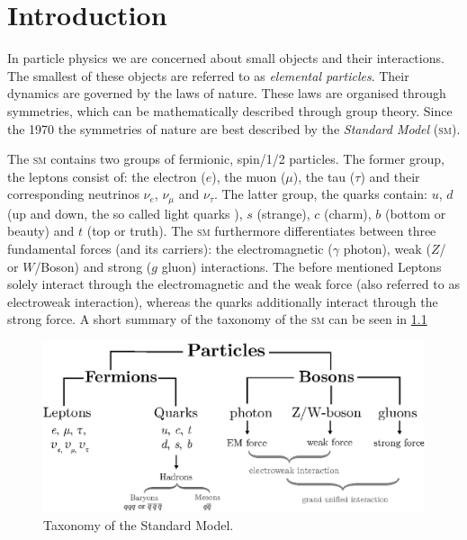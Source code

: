 \documentclass[../../index.tex]{subfiles}
\begin{document}
\chapter{Introduction}
In particle physics we are concerned about small objects and their interactions.
The smallest of these objects are referred to as \textit{elemental particles}.
Their dynamics are governed by the laws of nature. These laws are organised
through symmetries, which can be mathematically described through group theory.
Since the 1970 the symmetries of nature are best described by the
\textit{Standard Model} (\textsc{sm}).


The \textsc{sm} contains two groups of fermionic, spin\-/1/2 particles. The
former group, the leptons consist of: the electron ($e$), the muon ($\mu$), the
tau ($\tau$) and their corresponding neutrinos $\nu_e$, $\nu_\mu$ and
$\nu_\tau$. The latter group, the quarks contain: $u$, $d$ (up and down, the so
called light quarks ), $s$ (strange), $c$ (charm), $b$ (bottom or beauty) and
$t$ (top or truth). The \textsc{sm} furthermore differentiates between three
fundamental forces (and its carriers): the electromagnetic ($\gamma$ photon),
weak ($Z$\-/ or $W$\-/Boson) and strong ($g$ gluon) interactions. The before
mentioned Leptons solely interact through the electromagnetic and the weak force
(also referred to as electroweak interaction), whereas the quarks additionally
interact through the strong force. A short summary of the taxonomy of the
\textsc{sm} can be seen in \cref{fig:SMTaxonomy}
\begin{figure}
  \centering
  \includegraphics[width=\textwidth]{./images/standardModelTaxonomy.eps}
  \caption{Taxonomy of the Standard Model.}
  \label{fig:SMTaxonomy}
\end{figure}
\end{document}
